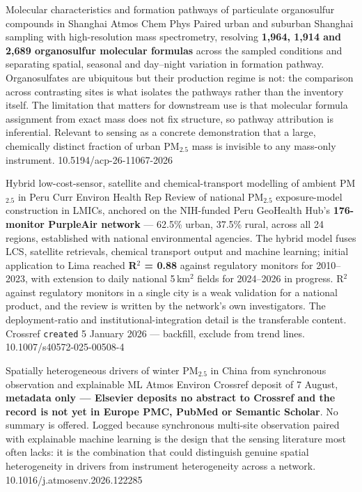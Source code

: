 \documentclass[10pt]{article}
\begin{document}
{Molecular characteristics and formation pathways of particulate organosulfur compounds in Shanghai}
{Atmos Chem Phys}
{Paired urban and suburban Shanghai sampling with high-resolution mass spectrometry,
resolving \textbf{1{,}964, 1{,}914 and 2{,}689 organosulfur molecular formulas} across the
sampled conditions and separating spatial, seasonal and day--night variation in formation
pathway. Organosulfates are ubiquitous but their production regime is not: the comparison
across contrasting sites is what isolates the pathways rather than the inventory itself.
The limitation that matters for downstream use is that molecular formula assignment from
exact mass does not fix structure, so pathway attribution is inferential. Relevant to
sensing as a concrete demonstration that a large, chemically distinct fraction of urban
PM$_{2.5}$ mass is invisible to any mass-only instrument.}
{10.5194/acp-26-11067-2026}

{Hybrid low-cost-sensor, satellite and chemical-transport modelling of ambient PM$_{2.5}$ in Peru}
{Curr Environ Health Rep}
{Review of national PM$_{2.5}$ exposure-model construction in LMICs, anchored on the
NIH-funded Peru GeoHealth Hub's \textbf{176-monitor PurpleAir network} --- 62.5\% urban,
37.5\% rural, across all 24 regions, established with national environmental agencies. The
hybrid model fuses LCS, satellite retrievals, chemical transport output and machine
learning; initial application to Lima reached \textbf{R$^2$ = 0.88} against regulatory
monitors for 2010--2023, with extension to daily national 5\,km$^2$ fields for 2024--2026
in progress. R$^2$ against regulatory monitors in a single city is a weak validation for a
national product, and the review is written by the network's own investigators. The
deployment-ratio and institutional-integration detail is the transferable content.
Crossref \texttt{created} 5 January 2026 --- backfill, exclude from trend lines.}
{10.1007/s40572-025-00508-4}

{Spatially heterogeneous drivers of winter PM$_{2.5}$ in China from synchronous observation and explainable ML}
{Atmos Environ}
{Crossref deposit of 7 August, \textbf{metadata only --- Elsevier deposits no abstract to
Crossref and the record is not yet in Europe PMC, PubMed or Semantic Scholar}. No summary
is offered. Logged because synchronous multi-site observation paired with explainable
machine learning is the design that the sensing literature most often lacks: it is the
combination that could distinguish genuine spatial heterogeneity in drivers from
instrument heterogeneity across a network.}
{10.1016/j.atmosenv.2026.122285}
\end{document}
